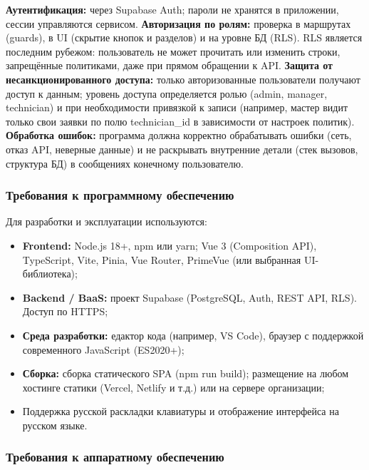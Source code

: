 \textbf{Аутентификация:} через Supabase Auth; пароли не хранятся в приложении, сессии управляются сервисом.\linebreak
\textbf{Авторизация по ролям:} проверка в маршрутах (guards), в UI (скрытие кнопок и разделов) и на уровне БД (RLS). RLS является последним рубежом: пользователь не может прочитать или изменить строки, запрещённые политиками, даже при прямом обращении к API.\linebreak
\textbf{Защита от несанкционированного доступа:} только авторизованные пользователи получают доступ к данным; уровень доступа определяется ролью (admin, manager, technician) и при необходимости привязкой к записи (например, мастер видит только свои заявки по полю technician\_id в зависимости от настроек политик).\linebreak
\textbf{Обработка ошибок:} программа должна корректно обрабатывать ошибки (сеть, отказ API, неверные данные) и не раскрывать внутренние детали (стек вызовов, структура БД) в сообщениях конечному пользователю.

\subsubsection{Требования к программному обеспечению}

Для разработки и эксплуатации используются:

\begin{itemize}
	\item \textbf{Frontend:} Node.js 18+, npm или yarn; Vue 3 (Composition API), TypeScript, Vite, Pinia, Vue Router, PrimeVue (или выбранная UI-библиотека);
	\item \textbf{Backend / BaaS:} проект Supabase (PostgreSQL, Auth, REST API, RLS). Доступ по HTTPS;
	\item \textbf{Среда разработки:} едактор кода (например, VS Code), браузер с поддержкой современного JavaScript (ES2020+);
	\item \textbf{Сборка:} сборка статического SPA (npm run build); размещение на любом хостинге статики (Vercel, Netlify и т.д.) или на сервере организации;
	\item Поддержка русской раскладки клавиатуры и отображение интерфейса на русском языке.
\end{itemize}

\subsubsection{Требования к аппаратному обеспечению}

